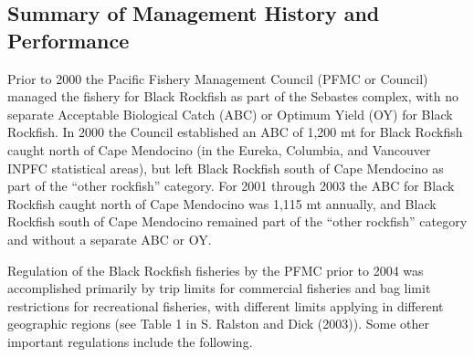 \documentclass[11pt,
  english,
  letterpaper,
]{article}
\begin{document}
\hypertarget{summary-of-management-history-and-performance}{%
\subsection{Summary of Management History and Performance}\label{summary-of-management-history-and-performance}}

Prior to 2000 the Pacific Fishery Management Council (PFMC or Council) managed the fishery for Black Rockfish as part of the Sebastes complex, with no separate Acceptable Biological Catch (ABC) or Optimum Yield (OY) for Black Rockfish. In 2000 the Council established an ABC of 1,200 mt for Black Rockfish caught north of Cape Mendocino (in the Eureka, Columbia, and Vancouver INPFC statistical areas), but left Black Rockfish south of Cape Mendocino as part of the ``other rockfish'' category. For 2001 through 2003 the ABC for Black Rockfish caught north of Cape Mendocino was 1,115 mt annually, and Black Rockfish south of Cape Mendocino remained part of the ``other rockfish'' category and without a separate ABC or OY.

Regulation of the Black Rockfish fisheries by the PFMC prior to 2004 was accomplished primarily by trip limits for commercial fisheries and bag limit restrictions for recreational fisheries, with different limits applying in different geographic regions (see Table 1 in S. Ralston and Dick (2003)). Some other important regulations include the following.
\end{document}
